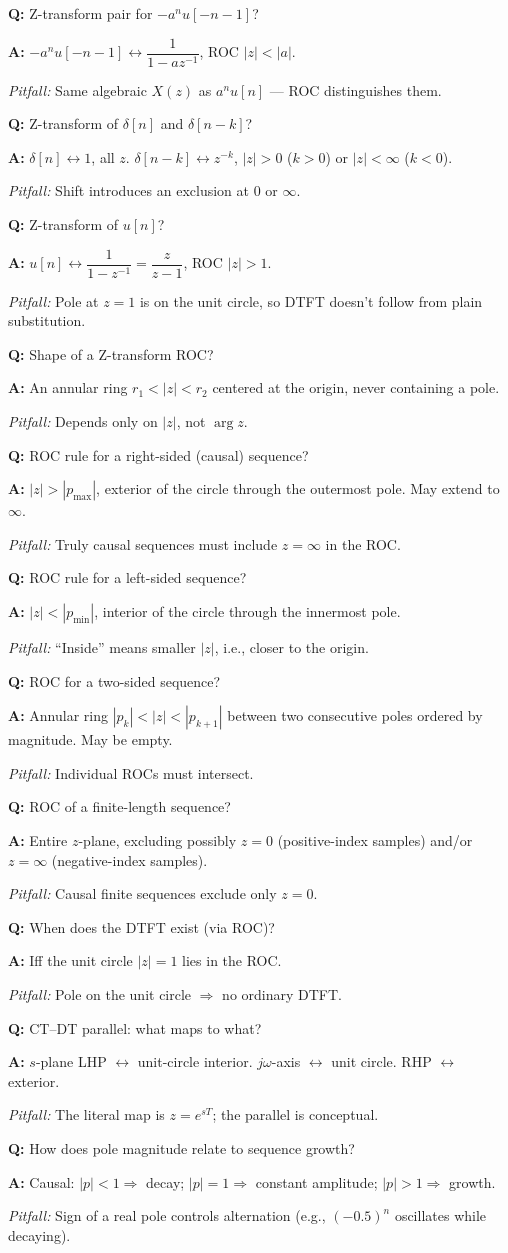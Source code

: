 \documentclass[11pt]{article}
\newcommand{\Q}[1]{\par\medskip\noindent\textbf{Q:} #1}
\newcommand{\A}[1]{\par\noindent\textbf{A:} #1}
\newcommand{\Pit}[1]{\par\noindent\textit{Pitfall:} #1}
\begin{document}
\Q{Z-transform pair for $-a^n u[-n-1]$?}
\A{$-a^n u[-n-1] \leftrightarrow \dfrac{1}{1-az^{-1}}$, ROC $|z|<|a|$.}
\Pit{Same algebraic $X(z)$ as $a^n u[n]$ --- ROC distinguishes them.}

\Q{Z-transform of $\delta[n]$ and $\delta[n-k]$?}
\A{$\delta[n]\leftrightarrow 1$, all $z$. $\delta[n-k]\leftrightarrow z^{-k}$, $|z|>0$ ($k>0$) or $|z|<\infty$ ($k<0$).}
\Pit{Shift introduces an exclusion at $0$ or $\infty$.}

\Q{Z-transform of $u[n]$?}
\A{$u[n]\leftrightarrow \dfrac{1}{1-z^{-1}} = \dfrac{z}{z-1}$, ROC $|z|>1$.}
\Pit{Pole at $z=1$ is on the unit circle, so DTFT doesn't follow from plain substitution.}

\Q{Shape of a Z-transform ROC?}
\A{An annular ring $r_1 < |z| < r_2$ centered at the origin, never containing a pole.}
\Pit{Depends only on $|z|$, not $\arg z$.}

\Q{ROC rule for a right-sided (causal) sequence?}
\A{$|z| > |p_{\max}|$, exterior of the circle through the outermost pole. May extend to $\infty$.}
\Pit{Truly causal sequences must include $z=\infty$ in the ROC.}

\Q{ROC rule for a left-sided sequence?}
\A{$|z|<|p_{\min}|$, interior of the circle through the innermost pole.}
\Pit{``Inside'' means smaller $|z|$, i.e., closer to the origin.}

\Q{ROC for a two-sided sequence?}
\A{Annular ring $|p_k|<|z|<|p_{k+1}|$ between two consecutive poles ordered by magnitude. May be empty.}
\Pit{Individual ROCs must intersect.}

\Q{ROC of a finite-length sequence?}
\A{Entire $z$-plane, excluding possibly $z=0$ (positive-index samples) and/or $z=\infty$ (negative-index samples).}
\Pit{Causal finite sequences exclude only $z=0$.}

\Q{When does the DTFT exist (via ROC)?}
\A{Iff the unit circle $|z|=1$ lies in the ROC.}
\Pit{Pole on the unit circle $\Rightarrow$ no ordinary DTFT.}

\Q{CT--DT parallel: what maps to what?}
\A{$s$-plane LHP $\leftrightarrow$ unit-circle interior. $j\omega$-axis $\leftrightarrow$ unit circle. RHP $\leftrightarrow$ exterior.}
\Pit{The literal map is $z=e^{sT}$; the parallel is conceptual.}

\Q{How does pole magnitude relate to sequence growth?}
\A{Causal: $|p|<1 \Rightarrow$ decay; $|p|=1 \Rightarrow$ constant amplitude; $|p|>1 \Rightarrow$ growth.}
\Pit{Sign of a real pole controls alternation (e.g., $(-0.5)^n$ oscillates while decaying).}
\end{document}
